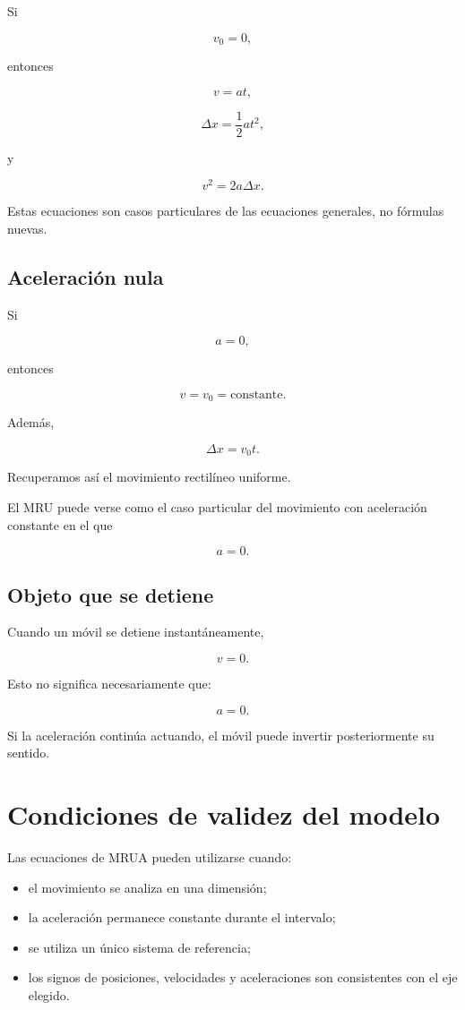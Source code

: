 Si

\[ v_0=0, \]

entonces

\[ v=at, \]

\[ \Delta x=\frac{1}{2}at^2, \]

y

\[ v^2=2a\Delta x. \]

Estas ecuaciones son casos particulares de las ecuaciones generales, no
fórmulas nuevas.


\subsection{Aceleración nula}

Si

\[ a=0, \]

entonces

\[ v=v_0=\text{constante}. \]

Además,

\[ \Delta x=v_0t. \]

Recuperamos así el movimiento rectilíneo uniforme.

\begin{idea}
El MRU puede verse como el caso particular del movimiento con aceleración
constante en el que

\[ a=0. \]
\end{idea}


\subsection{Objeto que se detiene}

Cuando un móvil se detiene instantáneamente,

\[ v=0. \]

Esto no significa necesariamente que:

\[ a=0. \]

Si la aceleración continúa actuando, el móvil puede invertir posteriormente
su sentido.


\section{Condiciones de validez del modelo}

\begin{condicion}
Las ecuaciones de MRUA pueden utilizarse cuando:

\begin{itemize}
    \item el movimiento se analiza en una dimensión;
    \item la aceleración permanece constante durante el intervalo;
    \item se utiliza un único sistema de referencia;
    \item los signos de posiciones, velocidades y aceleraciones son
    consistentes con el eje elegido.
\end{itemize}
\end{condicion}

